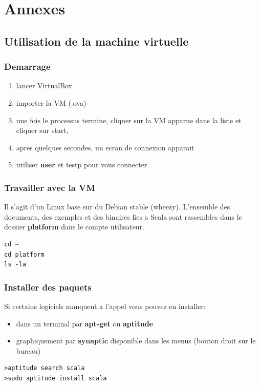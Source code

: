 \documentclass[xcolor=dvipsnames]{beamer}
\begin{document}
\section{Annexes}
\subsection{Utilisation de la machine virtuelle}
\begin{frame}
  \frametitle{Demarrage}
  \begin{enumerate}
  \item lancer VirtualBox
  \item importer la VM (.ova)
  \item une fois le processus termine, cliquer sur la VM apparue dans la liste et cliquer sur start,
  \item apres quelques secondes, un ecran de connexion apparait
  \item utiliser \textbf{user} et {testp} pour vous connecter
  \end{enumerate}
\end{frame}

\begin{frame}[fragile]
  \frametitle{Travailler avec la VM}
  Il s'agit d'un Linux base sur du Debian stable (wheezy).
  L'ensemble des documents, des exemples et des binaires lies a Scala
  sont rassembles dans le dossier \textbf{platform} dans le compte utilisateur.
\begin{verbatim}
cd ~
cd platform
ls -la
\end{verbatim}
\end{frame}

\begin{frame}[fragile]
  \frametitle{Installer des paquets}
  Si certains logiciels manquent a l'appel vous pouvez en installer:
  \begin{itemize}
  \item dans un terminal par \textbf{apt-get} ou \textbf{aptitude}
  \item graphiquement par \textbf{synaptic} disponible dans les menus (bouton droit sur le bureau)
  \end{itemize}
\begin{verbatim}
>aptitude search scala
>sudo aptitude install scala
\end{verbatim}
\end{frame}
\end{document}
